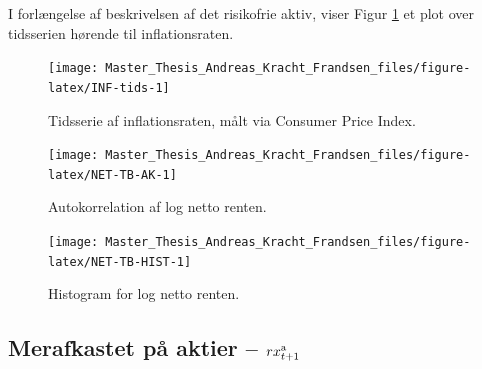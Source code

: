 \documentclass[
  a4paper,
  oneside]{memoir}
\begin{document}
I forlængelse af beskrivelsen af det risikofrie aktiv, viser Figur \ref{fig:INF-tids} et plot over tidsserien hørende til inflationsraten.

\begin{figure}[H]

{\centering \texttt{[image: Master\_Thesis\_Andreas\_Kracht\_Frandsen\_files/figure-latex/INF-tids-1]} 

}

\caption{Tidsserie af inflationsraten, målt via Consumer Price Index.}\label{fig:INF-tids}
\end{figure}

\begin{figure}[H]

{\centering \texttt{[image: Master\_Thesis\_Andreas\_Kracht\_Frandsen\_files/figure-latex/NET-TB-AK-1]} 

}

\caption{Autokorrelation af log netto renten.}\label{fig:NET-TB-AK}
\end{figure}

\begin{figure}[H]

{\centering \texttt{[image: Master\_Thesis\_Andreas\_Kracht\_Frandsen\_files/figure-latex/NET-TB-HIST-1]} 

}

\caption{Histogram for log netto renten.}\label{fig:NET-TB-HIST}
\end{figure}

\hypertarget{dataak}{%
\subsection{\texorpdfstring{Merafkastet på aktier -- \(rx_{t+1}^{\textnormal{a}}\)}{Merafkastet på aktier -- rx\_\{t+1\}\^{}\{\textbackslash textnormal\{a\}\}}}\label{dataak}}
\end{document}
